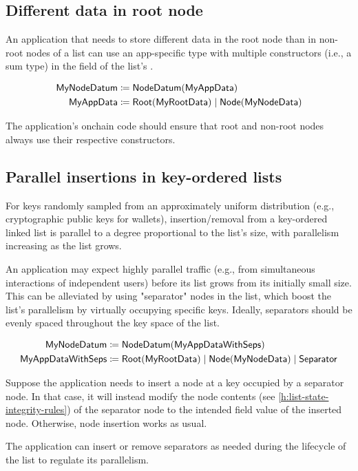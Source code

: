 \documentclass[../midgard.tex]{subfiles}
\begin{document}
\subsection{Different data in root node}
\label{h:list-different-data-in-root}

An application that needs to store different data in the root node than in non-root nodes of a list can use an app-specific type with multiple constructors (i.e., a sum type) in the  field of the list's . 

\begin{align*}
    \mathsf{MyNodeDatum} &\coloneq \mathsf{NodeDatum} (\mathsf{MyAppData}) \\
    \mathsf{MyAppData} &\coloneq \mathsf{Root}(\mathsf{MyRootData}) \;|\; \mathsf{Node}(\mathsf{MyNodeData})
\end{align*}

The application's onchain code should ensure that root and non-root nodes always use their respective constructors. 

\subsection{Parallel insertions in key-ordered lists}
\label{h:parallel-insertions-in-key-ordered-lists}

For keys randomly sampled from an approximately uniform distribution (e.g., cryptographic public keys for wallets), insertion/removal from a key-ordered linked list is parallel to a degree proportional to the list's size, with parallelism increasing as the list grows.

An application may expect highly parallel traffic (e.g., from simultaneous interactions of independent users) before its list grows from its initially small size. This can be alleviated by using "separator" nodes in the list, which boost the list's parallelism by virtually occupying specific keys. Ideally, separators should be evenly spaced throughout the key space of the list.

\begin{align*}
    \mathsf{MyNodeDatum} &\coloneq \mathsf{NodeDatum} (\mathsf{MyAppDataWithSeps}) \\
    \mathsf{MyAppDataWithSeps} &\coloneq \mathsf{Root}(\mathsf{MyRootData}) \;|\;
        \mathsf{Node}(\mathsf{MyNodeData}) \;|\;
        \mathsf{Separator}
\end{align*}

Suppose the application needs to insert a node at a key occupied by a separator node. In that case, it will instead modify the node contents (see \cref{h:list-state-integrity-rules}) of the separator node to the intended  field value of the inserted node. Otherwise, node insertion works as usual.

The application can insert or remove separators as needed during the lifecycle of the list to regulate its parallelism.
\end{document}
